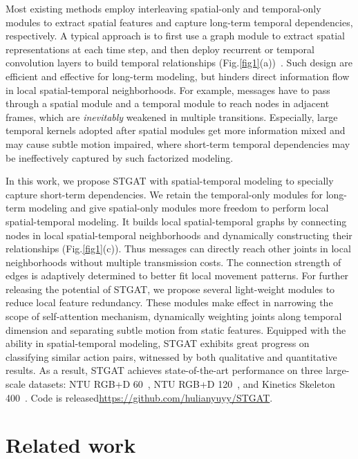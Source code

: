 \documentclass[runningheads]{llncs}
\begin{document}
Most existing methods employ interleaving spatial-only and temporal-only modules to extract spatial features and capture long-term temporal dependencies, respectively. A typical approach is to first use a graph module to extract spatial representations at each time step, and then deploy recurrent or temporal convolution layers to build temporal relationships (Fig.\ref{fig1}(a))~\cite{li2019spatio,si2019attention,li2019actional,shi2019two,yan2018spatial}. Such design are efficient and effective for long-term modeling, but hinders direct information flow in local spatial-temporal neighborhoods. For example, messages have to pass through a spatial module and a temporal module to reach nodes in adjacent frames, which are \textit{inevitably} weakened in multiple transitions. Especially, large temporal kernels adopted after spatial modules get more information mixed and may cause subtle motion impaired, where short-term temporal dependencies may be ineffectively captured by such factorized modeling.
  
In this work, we propose STGAT with spatial-temporal modeling to specially capture short-term dependencies. We retain the temporal-only modules for long-term modeling and give spatial-only modules more freedom to perform local spatial-temporal modeling. It builds local spatial-temporal graphs by connecting nodes in local spatial-temporal neighborhoods and dynamically constructing their relationships (Fig.\ref{fig1}(c)). Thus messages can directly reach other joints in local neighborhoods without multiple transmission costs. The connection strength of edges is adaptively determined to better fit local movement patterns. For further releasing the potential of STGAT, we propose several light-weight modules to reduce local feature redundancy. These modules make effect in narrowing the scope of self-attention mechanism, dynamically weighting joints along temporal dimension and separating subtle motion from static features. Equipped with the ability in spatial-temporal modeling, STGAT exhibits great progress on classifying similar action pairs, witnessed by both qualitative and quantitative results. As a result, STGAT achieves state-of-the-art performance on three large-scale datasets: NTU RGB+D 60~\cite{shahroudy2016ntu}, NTU RGB+D 120~\cite{liu2019ntu}, and Kinetics Skeleton 400~\cite{kay2017kinetics}. Code is released\href{https://github.com/hulianyuyy/STGAT}{https://github.com/hulianyuyy/STGAT}.

\section{Related work}
\end{document}
